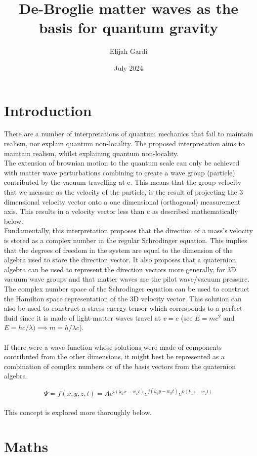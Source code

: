 \documentclass{article}
\title{De-Broglie matter waves as the basis for quantum gravity}
\author{Elijah Gardi}
\date{July 2024}
\begin{document}
\maketitle

\section{Introduction}
There are a number of interpretations of quantum mechanics that fail to maintain realism, nor explain quantum non-locality. The proposed interpretation aims to maintain realism, whilst explaining quantum non-locality.\\
The extension of brownian motion to the quantum scale can only be achieved with matter wave perturbations combining to create a wave group (particle) contributed by the vacuum travelling at c. This means that the group velocity that we measure as the velocity of the particle, is the result of projecting the 3 dimensional velocity vector onto a one dimensional (orthogonal) measurement axis. This results in a velocity vector less than c as described mathematically below.\\
Fundamentally, this interpretation proposes that the direction of a mass's velocity is stored as a complex number in the regular Schrodinger equation. This implies that the degrees of freedom in the system are equal to the dimension of the algebra used to store the direction vector. It also proposes that a quaternion algebra can be used to represent the direction vectors more generally, for 3D vacuum wave groups and that matter waves are the pilot wave/vacuum pressure. The complex number space of the Schrodinger equation can be used to construct the Hamilton space representation of the 3D velocity vector. This solution can also be used to construct a stress energy tensor which corresponds to a perfect fluid since it is made of light-matter waves travel at $v=c$ (see $E=mc^2$ and $E=hc/\lambda) \implies m=h/\lambda c$).\\
\\
If there were a wave function whose solutions were made of components contributed from the other dimensions, it might best be represented as a combination of complex numbers or of the basis vectors from the quaternion algebra.

$$\Psi=f(x,y,z,t)=A e^{i(k_x x-w_x t)} e^{j(k_y y-w_y t)} e^{k(k_z z-w_z t)}$$
\\
This concept is explored more thoroughly below. 
\section{Maths}
\end{document}
